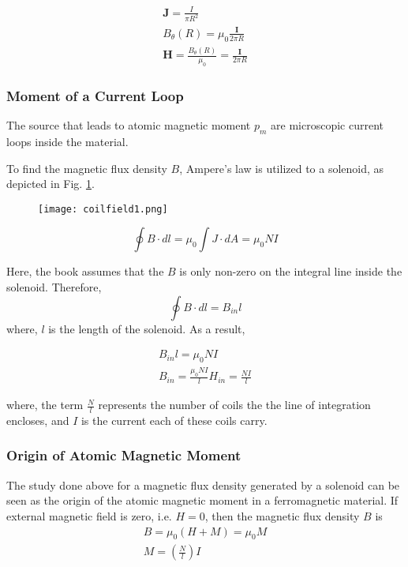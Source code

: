 \begin{eqnarray}
	\textbf{J} = \frac{I}{\pi R^{2}} \\
	B_{\theta}(R) = \mu_{0} \frac{\textbf{I}}{2 \pi R} \\
	\textbf{H} = \frac{B_{\theta}(R)}{\mu_{0}} = \frac{\textbf{I}}{2 \pi R}
\end{eqnarray}



\subsubsection{Moment of a Current Loop}

The source that leads to atomic magnetic moment $p_{m}$ are microscopic current loops inside the material.

To find the magnetic flux density $B$, Ampere's law is utilized to a solenoid, as depicted in Fig. \ref{fig:coilfield1}.
\begin{figure}[h]
    \centering
    \texttt{[image: coilfield1.png]}
    \label{fig:coilfield1}
\end{figure}

\begin{equation}
	\oint B \cdot dl = \mu_{0} \int J \cdot dA = \mu_{0} NI
\end{equation}

Here, the book assumes that the $B$ is only non-zero on the integral line inside the solenoid. Therefore, 
\begin{equation}
	\oint B \cdot dl = B_{in}l
\end{equation}
where, $l$ is the length of the solenoid. As a result,

\begin{eqnarray}
	B_{in}l = \mu_{0} NI \\
	B_{in} = \frac{\mu_{0} NI}{l}
	H_{in} = \frac{NI}{l}
\end{eqnarray}

where, the term $\frac{N}{l}$ represents the number of coils the the line of integration encloses, and $I$ is the current each of these coils carry.


\subsubsection{Origin of Atomic Magnetic Moment}

The study done above for a magnetic flux density generated by a solenoid can be seen as the origin of the atomic magnetic moment in a ferromagnetic material. If external magnetic field is zero, i.e. $H=0$, then the magnetic flux density $B$ is
\begin{eqnarray}
	B = \mu_{0} (H+M) = \mu_{0}M \\
	M = (\frac{N}{l})I
\end{eqnarray}

